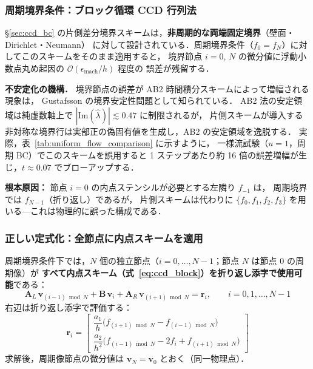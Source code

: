\subsubsection{周期境界条件：ブロック循環 CCD 行列法}
\label{app:ccd_periodic}

\begin{tcolorbox}[warnbox, title={片側スキームと周期 BC の相性問題}]
§\ref{sec:ccd_bc} の片側差分境界スキームは，\textbf{非周期的な両端固定境界}（壁面・Dirichlet・Neumann）
に対して設計されている．周期境界条件（$f_0 = f_N$）に対してこのスキームをそのまま適用すると，
境界節点 $i=0,\, N$ の微分値に浮動小数点丸め起因の $\mathcal{O}(\epsilon_{\mathrm{mach}}/h)$ 程度の
誤差が残留する．

\medskip
\textbf{不安定化の機構．}
境界節点の誤差が AB2 時間積分スキームによって増幅される現象は，
Gustafsson \cite{Gustafsson1981} の境界安定性問題として知られている．
AB2 法の安定領域は純虚数軸上で $|\mathrm{Im}(\hat{\lambda})| \lesssim 0.47$ に制限されるが，
片側スキームが導入する非対称な境界行は実部正の偽固有値を生成し，AB2 の安定領域を逸脱する．
実際，表~\ref{tab:uniform_flow_comparison} に示すように，
一様流試験（$u=1$，周期 BC）でこのスキームを誤用すると
1 ステップあたり約 16 倍の誤差増幅が生じ，$t \approx 0.07$ でブローアップする．

\medskip
\textbf{根本原因：}
節点 $i=0$ の内点ステンシルが必要とする左隣り $f_{-1}$ は，
周期境界では $f_{N-1}$（折り返し）であるが，
片側スキームは代わりに $\{f_0, f_1, f_2, f_3\}$ を用いる—これは物理的に誤った構成である．
\end{tcolorbox}

\subsubsection{正しい定式化：全節点に内点スキームを適用}

周期境界条件下では，$N$ 個の独立節点（$i = 0, \ldots, N-1$；節点 $N$ は節点 0 の周期像）が
\textbf{すべて内点スキーム（式~\eqref{eq:ccd_block}）を折り返し添字で使用可能}である：
%
\begin{equation}
  \mathbf{A}_L\,\bm{v}_{(i-1)\bmod N}
  + \mathbf{B}\,\bm{v}_i
  + \mathbf{A}_R\,\bm{v}_{(i+1)\bmod N}
  = \mathbf{r}_i, \qquad i = 0, 1, \ldots, N-1
  \label{eq:ccd_periodic}
\end{equation}
%
右辺は折り返し添字で評価する：
%
\begin{equation}
  \mathbf{r}_i =
  \begin{bmatrix}
    \dfrac{a_1}{h}\bigl(f_{(i+1)\bmod N} - f_{(i-1)\bmod N}\bigr) \\[8pt]
    \dfrac{a_2}{h^2}\bigl(f_{(i-1)\bmod N} - 2f_i + f_{(i+1)\bmod N}\bigr)
  \end{bmatrix}
  \label{eq:rhs_periodic}
\end{equation}
%
求解後，周期像節点の微分値は $\bm{v}_N = \bm{v}_0$ とおく（同一物理点）．

